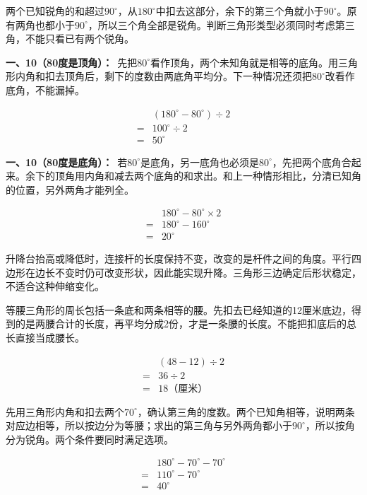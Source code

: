 \documentclass[multi=snippet,border=0pt]{standalone}
\newenvironment{snippet}[3]{\begin{minipage}{#1bp}\color{answerred}\fontsize{#2}{#3}\selectfont\raggedright}{\end{minipage}}
\begin{document}
\begin{snippet}{505}{11.5}{14}两个已知锐角的和超过\(90^\circ\)，从\(180^\circ\)中扣去这部分，余下的第三个角就小于\(90^\circ\)。原有两角也都小于\(90^\circ\)，所以三个角全部是锐角。判断三角形类型必须同时考虑第三角，不能只看已有两个锐角。\end{snippet}
\begin{snippet}{505}{11.5}{14}\textbf{一、10（80度是顶角）：}\ 先把\(80^\circ\)看作顶角，两个未知角就是相等的底角。用三角形内角和扣去顶角后，剩下的度数由两底角平均分。下一种情况还须把\(80^\circ\)改看作底角，不能漏掉。\par \[\begin{aligned}&(180^\circ-80^\circ)\div2\\={}&100^\circ\div2\\={}&50^\circ\end{aligned}\]\end{snippet}
\begin{snippet}{505}{11.5}{14}\textbf{一、10（80度是底角）：}\ 若\(80^\circ\)是底角，另一底角也必须是\(80^\circ\)，先把两个底角合起来。余下的顶角用内角和减去两个底角的和求出。和上一种情形相比，分清已知角的位置，另外两角才能列全。\par \[\begin{aligned}&180^\circ-80^\circ\times2\\={}&180^\circ-160^\circ\\={}&20^\circ\end{aligned}\]\end{snippet}
\begin{snippet}{505}{11.5}{14}升降台抬高或降低时，连接杆的长度保持不变，改变的是杆件之间的角度。平行四边形在边长不变时仍可改变形状，因此能实现升降。三角形三边确定后形状稳定，不适合这种伸缩变化。\end{snippet}
\begin{snippet}{505}{11.5}{14}等腰三角形的周长包括一条底和两条相等的腰。先扣去已经知道的12厘米底边，得到的是两腰合计的长度，再平均分成2份，才是一条腰的长度。不能把扣底后的总长直接当成腰长。\par \[\begin{aligned}&(48-12)\div2\\={}&36\div2\\={}&18\text{（厘米）}\end{aligned}\]\end{snippet}
\begin{snippet}{505}{11.5}{14}先用三角形内角和扣去两个\(70^\circ\)，确认第三角的度数。两个已知角相等，说明两条对应边相等，所以按边分为等腰；求出的第三角与另外两角都小于\(90^\circ\)，所以按角分为锐角。两个条件要同时满足选项。\par \[\begin{aligned}&180^\circ-70^\circ-70^\circ\\={}&110^\circ-70^\circ\\={}&40^\circ\end{aligned}\]\end{snippet}
\end{document}
